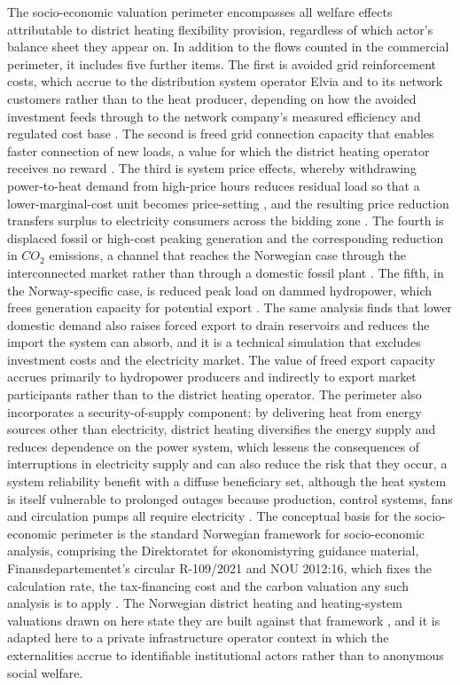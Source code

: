 The socio-economic valuation perimeter encompasses all welfare effects attributable to district heating flexibility provision, regardless of which actor's balance sheet they appear on. In addition to the flows counted in the commercial perimeter, it includes five further items. The first is avoided grid reinforcement costs, which accrue to the distribution system operator Elvia and to its network customers rather than to the heat producer, depending on how the avoided investment feeds through to the network company's measured efficiency and regulated cost base \cite{Thema_fjernvarme_2024}. The second is freed grid connection capacity that enables faster connection of new loads, a value for which the district heating operator receives no reward \cite{Thema_fjernvarme_2024}. The third is system price effects, whereby withdrawing power-to-heat demand from high-price hours reduces residual load so that a lower-marginal-cost unit becomes price-setting \cite{nagel_european_2023}, and the resulting price reduction transfers surplus to electricity consumers across the bidding zone \cite{Thema_fjernvarme_2024}. The fourth is displaced fossil or high-cost peaking generation and the corresponding reduction in $CO_2$ emissions, a channel that reaches the Norwegian case through the interconnected market rather than through a domestic fossil plant \cite{meibom_value_2007, penttinen_optimal_2021}. The fifth, in the Norway-specific case, is reduced peak load on dammed hydropower, which frees generation capacity for potential export \cite{askeland_balancing_2019}. The same analysis finds that lower domestic demand also raises forced export to drain reservoirs and reduces the import the system can absorb, and it is a technical simulation that excludes investment costs and the electricity market. The value of freed export capacity accrues primarily to hydropower producers and indirectly to export market participants rather than to the district heating operator. The perimeter also incorporates a security-of-supply component: by delivering heat from energy sources other than electricity, district heating diversifies the energy supply and reduces dependence on the power system, which lessens the consequences of interruptions in electricity supply and can also reduce the risk that they occur, a system reliability benefit with a diffuse beneficiary set, although the heat system is itself vulnerable to prolonged outages because production, control systems, fans and circulation pumps all require electricity \cite{Thema_fjernvarme_2024}. The conceptual basis for the socio-economic perimeter is the standard Norwegian framework for socio-economic analysis, comprising the Direktoratet for økonomistyring guidance material, Finansdepartementet's circular R-109/2021 and NOU 2012:16, which fixes the calculation rate, the tax-financing cost and the carbon valuation any such analysis is to apply \cite{finansdepartement_prinsipper_2021}. The Norwegian district heating and heating-system valuations drawn on here state they are built against that framework \cite{Thema_fjernvarme_2024, rosnes_energifleksible_2023}, and it is adapted here to a private infrastructure operator context in which the externalities accrue to identifiable institutional actors rather than to anonymous social welfare.

